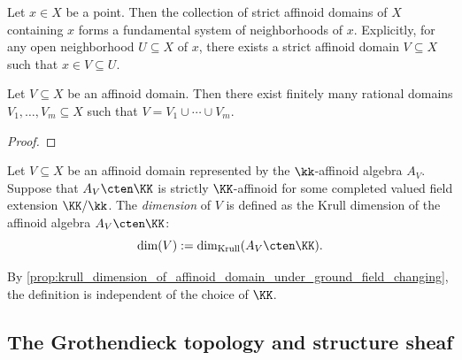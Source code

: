     \begin{proposition}\label{prop:strictly_affinoid_domain_form_a_system_of_neighborhood}
        Let \(x \in X\) be a point.
        Then the collection of strict affinoid domains of \(X\) containing \(x\) forms a fundamental system of neighborhoods of \(x\).
        Explicitly, for any open neighborhood \(U \subseteq X\) of \(x\), there exists a strict affinoid domain \(V \subseteq X\) such that \(x \in V \subseteq U\).
    \end{proposition}




    \begin{theorem}\label{thm:gerritzen_grauert_theorem}
        Let \(V \subseteq X\) be an affinoid domain.
        Then there exist finitely many rational domains \(V_1,\ldots,V_m \subseteq X\) such that \(V = V_1 \cup \cdots \cup V_m\).
    \end{theorem}
    \begin{proof}
    \end{proof}


    
    \begin{definition}\label{def:dimension_of_affinoid_domain}
        Let \(V \subseteq X\) be an affinoid domain represented by the \(\kk\)-affinoid algebra \(A_V\).
        Suppose that \(A_V \cten \KK\) is strictly \(\KK\)-affinoid for some completed valued field extension \(\KK/\kk\).
        The \emph{dimension} of \(V\) is defined as the Krull dimension of the affinoid algebra \(A_V \cten \KK\):
        \[ \dim(V) := \dim_{\text{Krull}}(A_V \cten \KK). \]
    \end{definition}

    By \cref{prop:krull_dimension_of_affinoid_domain_under_ground_field_changing}, the definition is independent of the choice of \(\KK\).



\subsection{The Grothendieck topology and structure sheaf}

